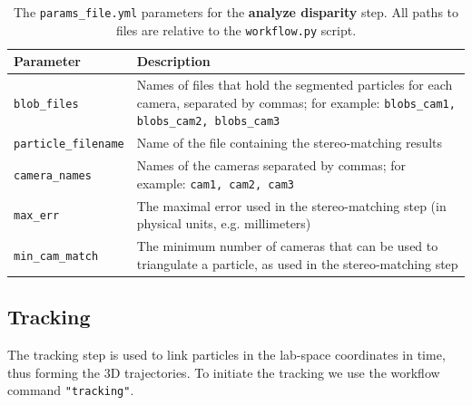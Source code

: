 \documentclass[10pt,a4paper]{article}
\begin{document}
\begin{table}[!ht]
	\centering
	\caption{The \texttt{params\_file.yml} parameters for the \textbf{analyze disparity} step. All paths to files are relative to the \texttt{workflow.py} script.}
	\label{tab:analyze_disparity}
	\begin{tabular}{l m{13cm}}
		\hline
		Parameter & Description\\[.1cm]
		\hline
		
		\texttt{blob\_files} & Names of files that hold the segmented particles for each camera, separated by commas; for example: \texttt{blobs\_cam1, blobs\_cam2, blobs\_cam3} \\[.1cm]
		
		\texttt{particle\_filename} & Name of the file containing the  stereo-matching results\\[.1cm]
		
		\texttt{camera\_names} & Names of the cameras separated by commas; for example: \texttt{cam1, cam2, cam3} \\[.1cm]
		
		\texttt{max\_err} & The maximal error used in the stereo-matching step (in physical units, e.g. millimeters) \\[.1cm]
		
		\texttt{min\_cam\_match} & The minimum number of cameras that can be used to triangulate a particle, as used in the stereo-matching step \\[.1cm]
		
		\hline
	\end{tabular}
\end{table}










\subsection{Tracking}\label{sec:workflow_track}

The tracking step is used to link particles in the lab-space coordinates in time, thus forming the 3D trajectories. To initiate the tracking we use the workflow command \texttt{"tracking"}. 
\end{document}
